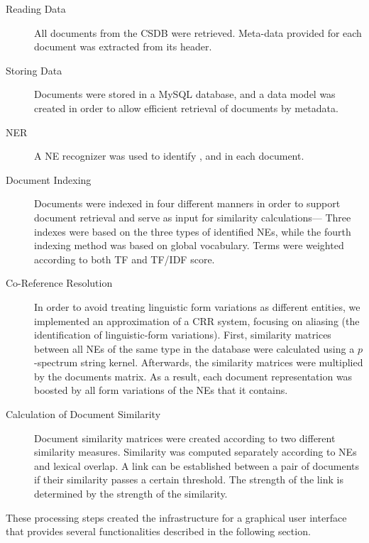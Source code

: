 \begin{description}
\item[Reading Data] All documents from the CSDB were retrieved. Meta-data provided for each document was extracted from its header.
\item[Storing Data] Documents were stored in a MySQL database, and a data model was created in order to allow efficient retrieval of documents by metadata.
\item[NER] A NE recognizer was used to identify ,  and  in each document.
\item[Document Indexing] Documents were indexed in four different manners in order to support document retrieval and serve as input for similarity calculations--- Three indexes were based on the three types of identified NEs, while the fourth indexing method was based on global vocabulary. Terms were weighted according to both TF and TF/IDF score.
\item[Co-Reference Resolution] In order to avoid treating linguistic form variations as different entities, we implemented an approximation of a CRR system, focusing on aliasing (the identification of linguistic-form variations).
First, similarity matrices between all NEs of the same type in the database were calculated using a $p$-spectrum string kernel.
Afterwards, the similarity matrices were multiplied by the documents matrix. As a result, each document representation was boosted by all form 
variations of the NEs that it contains.
\item[Calculation of Document Similarity] Document similarity matrices were created according to two different similarity measures. 
Similarity was computed separately according to NEs and lexical overlap. 
A link can be established between a pair of documents if their similarity passes a certain threshold. 
The strength of the link is determined by the strength of the similarity.
\end{description}

These processing steps created the infrastructure for a graphical user interface that provides several
functionalities described in the following section.

